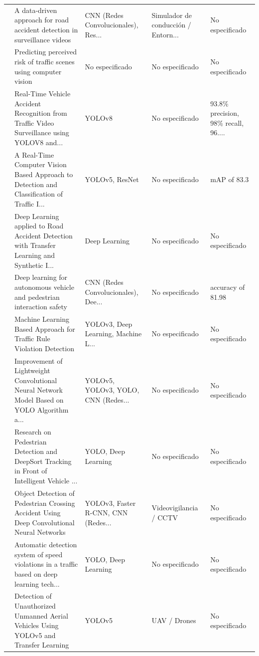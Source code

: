 \begin{table}[htbp]
\begin{tabular}{cp{7.5cm}p{2.8cm}p{2.8cm}p{2.8cm}}
\cite{zahid2023datadriven} & A data-driven approach for road accident detection in surveillance videos & CNN (Redes Convolucionales), Res... & Simulador de conducción / Entorn... & No especificado \\
\cite{winter2023predicting} & Predicting perceived risk of traffic scenes using computer vision & No especificado & No especificado & No especificado \\
\cite{mane2023realtime} & Real-Time Vehicle Accident Recognition from Traffic Video Surveillance using YOLOV8 and... & YOLOv8 & No especificado & 93.8\% precision, 98\% recall, 96.... \\
\cite{ahmed2023realtime} & A Real-Time Computer Vision Based Approach to Detection and Classification of Traffic I... & YOLOv5, ResNet & No especificado & mAP of 83.3 \\
\cite{tamagusko2022deep} & Deep Learning applied to Road Accident Detection with Transfer Learning and Synthetic I... & Deep Learning & No especificado & No especificado \\
\cite{zhu2022deep} & Deep learning for autonomous vehicle and pedestrian interaction safety & CNN (Redes Convolucionales), Dee... & No especificado & accuracy of 81.98 \\
\cite{lavingia2022machine} & Machine Learning Based Approach for Traffic Rule Violation Detection & YOLOv3, Deep Learning, Machine L... & No especificado & No especificado \\
\cite{du2022improvement} & Improvement of Lightweight Convolutional Neural Network Model Based on YOLO Algorithm a... & YOLOv5, YOLOv3, YOLO, CNN (Redes... & No especificado & No especificado \\
\cite{chen2022research} & Research on Pedestrian Detection and DeepSort Tracking in Front of Intelligent Vehicle ... & YOLO, Deep Learning & No especificado & No especificado \\
\cite{yasamorn2022object} & Object Detection of Pedestrian Crossing Accident Using Deep Convolutional Neural Networks & YOLOv3, Faster R-CNN, CNN (Redes... & Videovigilancia / CCTV & No especificado \\
\cite{cypto2022automatic} & Automatic detection system of speed violations in a traffic based on deep learning tech... & YOLO, Deep Learning & No especificado & No especificado \\
\cite{alqubaydhi2022unauthorized} & Detection of Unauthorized Unmanned Aerial Vehicles Using YOLOv5 and Transfer Learning & YOLOv5 & UAV / Drones & No especificado \\

\end{tabular}
\end{table}
